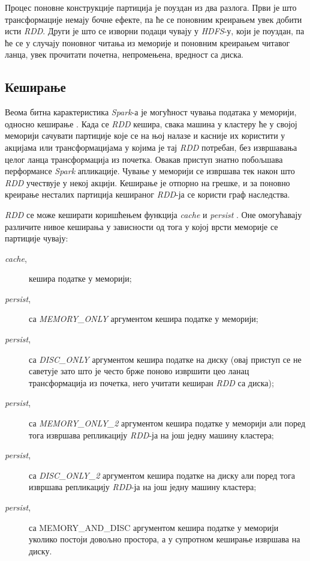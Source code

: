 \documentclass[12pt,oneside]{memoir}
\begin{document}
Процес поновне конструкције партиција је поуздан из два разлога. Први је што трансформације немају бочне ефекте, па ће се поновним креирањем увек добити исти \textit{RDD}. Други је што се изворни подаци чувају у \textit{HDFS}-у, који је поуздан, па ће се у случају поновног читања из меморије и поновним креирањем читавог ланца, увек прочитати почетна, непромењена, вредност са диска.

\subsection{Кеширање}
\label{subsec:spark_persist}

Веома битна карактеристика \textit{Spark}-а је могућност чувања података у меморији, односно кеширање \cite{spark_rdd}. Када се \textit{RDD} кешира, свака машина у кластеру ће у својој меморији сачувати партиције које се на њој налазе и касније их користити у акцијама или трансформацијама у којима је тај \textit{RDD} потребан, без извршавања целог ланца трансформација из почетка. Овакав приступ знатно побољшава перформансе \textit{Spark} апликације. Чување у меморији се извршава тек након што \textit{RDD} учествује у некој акцији. Кеширање је отпорно на грешке, и за поновно креирање несталих партиција кешираног \textit{RDD}-ја се користи граф наследства.

\textit{RDD} се може кеширати коришћењем функција \textit{cache} и \textit{persist} \cite{spark_rdd}. Оне омогућавају различите нивое кеширања у зависности од тога у којој врсти меморије се партиције чувају:

\begin{description}
	\item[\textit{cache},] кешира податке у меморији;

	\item[\textit{persist},] са \textit{MEMORY\_ONLY} аргументом кешира податке у меморији;

	\item[\textit{persist},] са \textit{DISC\_ONLY} аргументом кешира податке на диску (овај приступ се не саветује зато што је често брже поново извршити цео ланац трансформација из почетка, него учитати кеширан \textit{RDD} са диска);

	\item[\textit{persist},] са \textit{MEMORY\_ONLY\_2} аргументом кешира податке у меморији али поред тога извршава репликацију \textit{RDD}-ја на још једну машину кластера;

	\item[\textit{persist},] са \textit{DISC\_ONLY\_2} аргументом кешира податке на диску али поред тога извршава репликацију \textit{RDD}-ја на још једну машину кластера;

	\item[\textit{persist},] са {MEMORY\_AND\_DISC} аргументом кешира податке у меморији уколико постоји довољно простора, а у супротном кеширање извршава на диску.
\end{description}
\end{document}
